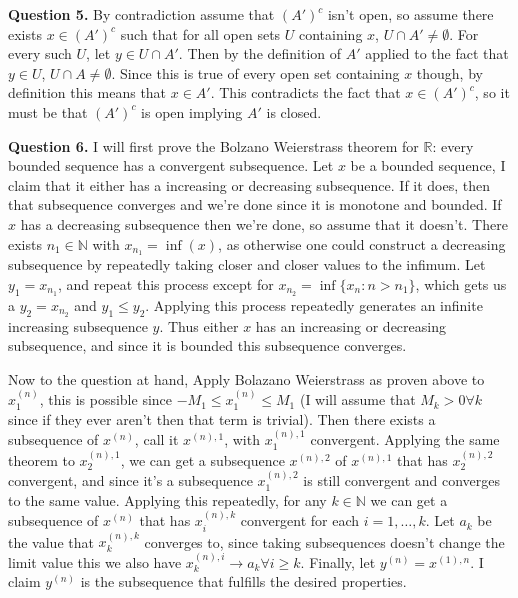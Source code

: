 \documentclass[letterpaper, reqno,11pt]{article}
\begin{document}
\newpage\phantom{blabla}
\newpage

{\medskip\noindent\bf Question 5.} By contradiction assume that $(A')^{c}$ isn't open, so assume there exists $x\in(A')^{c}$ such that for all open sets $U$ containing $x$, $U\cap A'\neq\emptyset$. For every such $U$, let $y\in U\cap A'$. Then by the definition of $A'$ applied to the fact that $y\in U$, $U\cap A\neq \emptyset$. Since this is true of every open set containing $x$ though, by definition this means that $x\in A'$. This contradicts the fact that $x\in(A')^{c}$, so it must be that $(A')^{c}$ is open implying $A'$ is closed.

\newpage\phantom{blabla}
\newpage

{\medskip\noindent\bf Question 6.} I will first prove the Bolzano Weierstrass theorem for $\mathbb{R}$: every bounded sequence has a convergent subsequence. Let $x$ be a bounded sequence, I claim that it either has a increasing or decreasing subsequence. If it does, then that subsequence converges and we're done since it is monotone and bounded. If $x$ has a decreasing subsequence then we're done, so assume that it doesn't. There exists $n_1\in \mathbb{N}$ with $x_{n_1}=\inf(x)$, as otherwise one could construct a decreasing subsequence by repeatedly taking closer and closer values to the infimum. Let $y_1=x_{n_1}$, and repeat this process except for $x_{n_2}=\inf \{x_n: n>n_1\}$, which gets us a $y_2=x_{n_2}$ and $y_1\leq y_2$. Applying this process repeatedly generates an infinite increasing subsequence $y$. Thus either $x$ has an increasing or decreasing subsequence, and since it is bounded this subsequence converges.

Now to the question at hand, Apply Bolazano Weierstrass as proven above to $x^{(n)}_1$, this is possible since $-M_1\leq x^{(n)}_1\leq M_1$ (I will assume that $M_k>0\forall k$ since if they ever aren't then that term is trivial). Then there exists a subsequence of $x^{(n)}$, call it $x^{(n),1}$, with $x^{(n),1}_1$ convergent. Applying the same theorem to $x^{(n),1}_2$, we can get a subsequence $x^{(n),2}$ of $x^{(n),1}$ that has $x^{(n),2}_2$ convergent, and since it's a subsequence $x^{(n),2}_1$ is still convergent and converges to the same value. Applying this repeatedly, for any $k\in \mathbb{N}$ we can get a subsequence of $x^{(n)}$ that has $x^{(n),k}_i$ convergent for each $i=1,\ldots,k$. Let $a_k$ be the value that $x^{(n),k}_k$ converges to, since taking subsequences doesn't change the limit value this we also have $x^{(n),i}_k\to a_k\forall i\geq k$. Finally, let $y^{(n)}=x^{(1),n}$. I claim $y^{(n)}$ is the subsequence that fulfills the desired properties.
\end{document}
